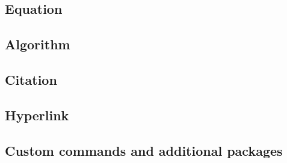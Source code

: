 \subsection{Equation}
\subsection{Algorithm}
\subsection{Citation}
\subsection{Hyperlink}
\subsection{Custom commands and additional packages}

\clearpage
